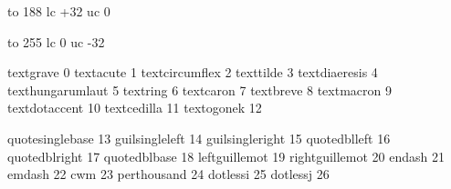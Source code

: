 

\startmapping[ec]




 to 188 lc +32 uc 0


 to 255 lc 0 uc -32


\stopmapping

\startencoding[ec][ec] %

 textgrave         0
 textacute         1
 textcircumflex    2
 texttilde         3
 textdiaeresis     4
 texthungarumlaut  5
 textring          6
 textcaron         7
 textbreve         8
 textmacron        9
 textdotaccent    10
 textcedilla      11 
 textogonek       12 

 quotesinglebase  13 %
 guilsingleleft   14 %
 guilsingleright  15 %
 quotedblleft     16 %
 quotedblright    17 %
 quotedblbase     18 %
 leftguillemot    19
 rightguillemot   20
 endash           21 %
 emdash           22 %
 cwm              23 %
 perthousand      24
 dotlessi         25
 dotlessj         26

